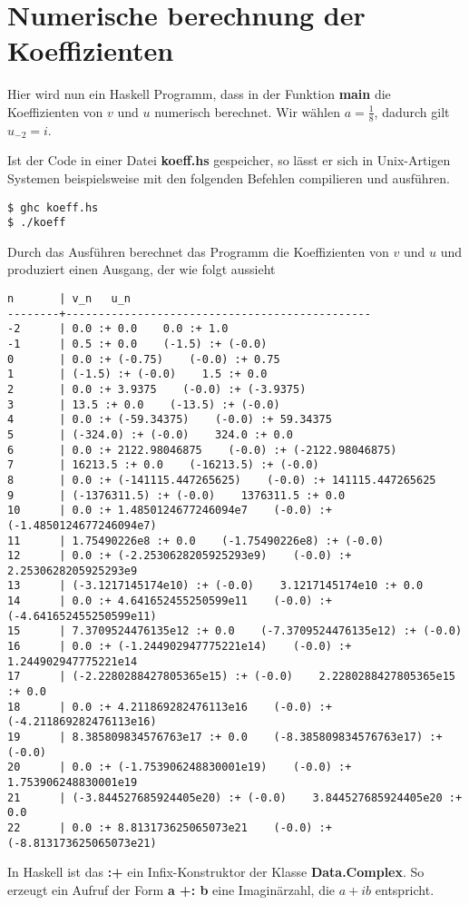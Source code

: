 \chapter{Numerische berechnung der Koeffizienten}
Hier wird nun ein Haskell Programm, dass in der Funktion \textbf{main} die
Koeffizienten von $v$ und $u$ numerisch berechnet. Wir wählen $a=\frac{1}{8}$,
dadurch gilt $u_{-2}=i$.


Ist der Code in einer Datei \textbf{koeff.hs} gespeicher, so lässt er sich
in Unix-Artigen Systemen beispielsweise mit den folgenden Befehlen compilieren
und ausführen.
\begin{lstlisting}[style=Bash]
$ ghc koeff.hs
$ ./koeff
\end{lstlisting}
Durch das Ausführen berechnet das Programm die Koeffizienten von $v$ und $u$
und produziert einen Ausgang, der wie folgt aussieht
\begin{lstlisting}[style=Bash]
n       | v_n   u_n
--------+-----------------------------------------------
-2      | 0.0 :+ 0.0    0.0 :+ 1.0
-1      | 0.5 :+ 0.0    (-1.5) :+ (-0.0)
0       | 0.0 :+ (-0.75)    (-0.0) :+ 0.75
1       | (-1.5) :+ (-0.0)    1.5 :+ 0.0
2       | 0.0 :+ 3.9375    (-0.0) :+ (-3.9375)
3       | 13.5 :+ 0.0    (-13.5) :+ (-0.0)
4       | 0.0 :+ (-59.34375)    (-0.0) :+ 59.34375
5       | (-324.0) :+ (-0.0)    324.0 :+ 0.0
6       | 0.0 :+ 2122.98046875    (-0.0) :+ (-2122.98046875)
7       | 16213.5 :+ 0.0    (-16213.5) :+ (-0.0)
8       | 0.0 :+ (-141115.447265625)    (-0.0) :+ 141115.447265625
9       | (-1376311.5) :+ (-0.0)    1376311.5 :+ 0.0
10      | 0.0 :+ 1.4850124677246094e7    (-0.0) :+ (-1.4850124677246094e7)
11      | 1.75490226e8 :+ 0.0    (-1.75490226e8) :+ (-0.0)
12      | 0.0 :+ (-2.2530628205925293e9)    (-0.0) :+ 2.2530628205925293e9
13      | (-3.1217145174e10) :+ (-0.0)    3.1217145174e10 :+ 0.0
14      | 0.0 :+ 4.641652455250599e11    (-0.0) :+ (-4.641652455250599e11)
15      | 7.3709524476135e12 :+ 0.0    (-7.3709524476135e12) :+ (-0.0)
16      | 0.0 :+ (-1.244902947775221e14)    (-0.0) :+ 1.244902947775221e14
17      | (-2.2280288427805365e15) :+ (-0.0)    2.2280288427805365e15 :+ 0.0
18      | 0.0 :+ 4.211869282476113e16    (-0.0) :+ (-4.211869282476113e16)
19      | 8.385809834576763e17 :+ 0.0    (-8.385809834576763e17) :+ (-0.0)
20      | 0.0 :+ (-1.753906248830001e19)    (-0.0) :+ 1.753906248830001e19
21      | (-3.844527685924405e20) :+ (-0.0)    3.844527685924405e20 :+ 0.0
22      | 0.0 :+ 8.813173625065073e21    (-0.0) :+ (-8.813173625065073e21)
\end{lstlisting}
In Haskell ist das \textbf{:+} ein Infix-Konstruktor der Klasse
\textbf{Data.Complex}. So erzeugt ein Aufruf der Form \textbf{a +: b} eine
Imaginärzahl, die $a+ib$ entspricht.

